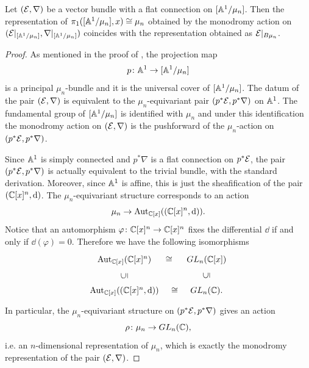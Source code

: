 \documentclass{article}
\begin{document}
\begin{prop} \label{prop: monodromy representation}
Let $(\mathcal{E}, \nabla)$ be a vector bundle with a flat connection on $[\mathbb{A}^1 / \mu_n]$. Then the representation of $\pi_1([\mathbb{A}^1 / \mu_n], x) \cong \mu_n$ obtained by the monodromy action on $(\mathcal{E}\vert_{[\mathbb{A}^1 / \mu_n]}, \nabla\vert_{[\mathbb{A}^1 / \mu_n]})$ coincides with the representation obtained as $\mathcal{E}\vert_{B \mu_n}$.
\end{prop}
\begin{proof}
As mentioned in the proof of , the projection map
\begin{equation}
p \colon \mathbb{A}^1 \to [\mathbb{A}^1 / \mu_n]
\end{equation}
is a principal $\mu_n$-bundle and it is the universal cover of $[\mathbb{A}^1 / \mu_n]$. The datum of the pair $(\mathcal{E}, \nabla)$ is equivalent to the $\mu_n$-equivariant pair $(p^*\mathcal{E}, p^*\nabla)$ on $\mathbb{A}^1$. The fundamental group of $[\mathbb{A}^1 / \mu_n]$ is identified with $\mu_n$ and under this identification the monodromy action on $(\mathcal{E}, \nabla)$ is the pushforward of the $\mu_n$-action on $(p^*\mathcal{E}, p^*\nabla)$.

Since $\mathbb{A}^1$ is simply connected and $p^*\nabla$ is a flat connection on $p^*\mathcal{E}$, the pair $(p^*\mathcal{E}, p^*\nabla)$ is actually equivalent to the trivial bundle, with the standard derivation. Moreover, since $\mathbb{A}^1$ is affine, this is just the sheafification of the pair $(\mathbb{C}[x]^n, \mathop{}\!\mathrm{d})$. The $\mu_n$-equivariant structure corresponds to an action
\begin{equation}
\mu_n \to \operatorname{Aut}_{\mathbb{C}[x]}( (\mathbb{C}[x]^n, \mathop{}\!\mathrm{d}) ).
\end{equation}
Notice that an automorphism $\varphi\colon \mathbb{C}[x]^n \to \mathbb{C}[x]^n$ fixes the differential $\dd$ if and only if $\dd(\varphi) = 0$. Therefore we have the following isomorphisms
\begin{equation}
\begin{tikzcd}
	{\Aut_{\Cb[x]}(\Cb[x]^n)} & {GL_n(\Cb[x])} \\
	{\Aut_{\Cb[x]}((\Cb[x]^n, \dd))} & {GL_n(\Cb).}
	\arrow["\cong"{marking, allow upside down}, draw=none, from=1-1, to=1-2]
	\arrow["\subseteq"{marking, allow upside down}, draw=none, from=2-1, to=1-1]
	\arrow["\cong"{marking, allow upside down}, draw=none, from=2-1, to=2-2]
	\arrow["\subseteq"{marking, allow upside down}, draw=none, from=2-2, to=1-2]
\end{tikzcd}
\end{equation}
In particular, the $\mu_n$-equivariant structure on $(p^*\mathcal{E}, p^*\nabla)$ gives an action
\begin{equation}
\rho \colon \mu_n \to GL_n(\mathbb{C}),
\end{equation}
i.e. an $n$-dimensional representation of $\mu_n$, which is exactly the monodromy representation of the pair $(\mathcal{E}, \nabla)$.


\end{proof}
\end{document}
